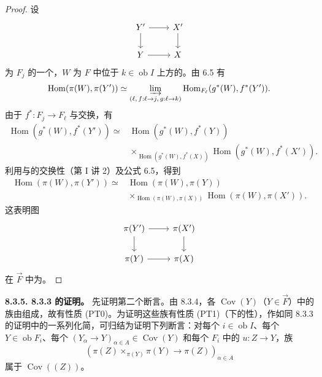 \begin{proof}
设
\[\begin{tikzcd}
Y'\arrow[r]\arrow[d]&X'\arrow[d]\\
Y\arrow[r]&X
\end{tikzcd}\]
为 $F_j$ 的一个，$W$ 为 $F$ 中位于 $k\in\operatorname{ob}I$ 上方的。由 6.5 有
\[\operatorname{Hom}(\pi(W),\pi(Y'))\simeq\varinjlim_{(\ell,\,f:\ell\to j,\,g:\ell\to k)}\operatorname{Hom}_{F_\ell}(g^*(W),f^*(Y')).\]
由于 $f^*:F_j\to F_\ell$ 与交换，有
\[\begin{aligned}
\operatorname{Hom}(g^*(W),f^*(Y'))\simeq{}&\operatorname{Hom}(g^*(W),f^*(Y))\\
&\times_{\operatorname{Hom}(g^*(W),f^*(X))}\operatorname{Hom}(g^*(W),f^*(X')).
\end{aligned}\]
利用与的交换性（第 I 讲 2）及公式 6.5，得到
\[\begin{aligned}
\operatorname{Hom}(\pi(W),\pi(Y'))\simeq{}&\operatorname{Hom}(\pi(W),\pi(Y))\\
&\times_{\operatorname{Hom}(\pi(W),\pi(X))}\operatorname{Hom}(\pi(W),\pi(X')).
\end{aligned}\]
这表明图
\[\begin{tikzcd}
\pi(Y')\arrow[r]\arrow[d]&\pi(X')\arrow[d]\\
\pi(Y)\arrow[r]&\pi(X)
\end{tikzcd}\]
在 $\overrightarrow F$ 中为。
\end{proof}
\textbf{8.3.5. 8.3.3 的证明。} 先证明第二个断言。由 8.3.4，各 $\operatorname{Cov}(Y)$（$Y\in\overrightarrow F$）中的族由组成，故有性质 (PT0)。为证明这些族有性质 (PT1)（下的性），作如同 8.3.3 的证明中的一系列化简，可归结为证明下列断言：对每个 $i\in\operatorname{ob}I$、每个 $Y\in\operatorname{ob}F_i$、每个 $(Y_\alpha\to Y)_{\alpha\in A}\in\operatorname{Cov}(Y)$ 和每个 $F_i$ 中的 $u:Z\to Y$，族
\[(\pi(Z)\times_{\pi(Y)}\pi(Y)\longrightarrow\pi(Z))_{\alpha\in A}\]
属于 $\operatorname{Cov}((Z))$。

